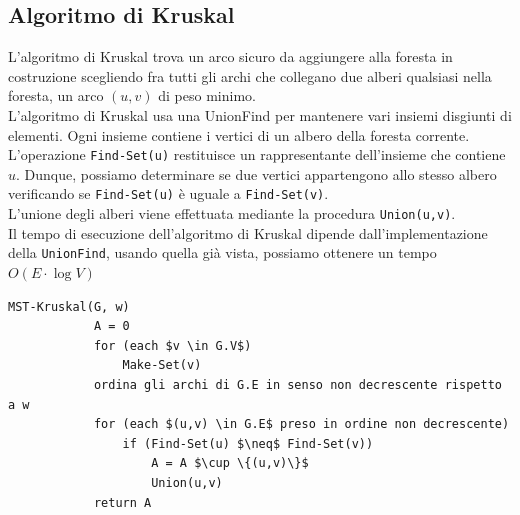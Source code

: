 \subsection{Algoritmo di Kruskal}
L'algoritmo di Kruskal trova un arco sicuro da aggiungere alla foresta in costruzione scegliendo fra tutti gli archi che collegano due alberi qualsiasi nella foresta, un arco $(u,v)$ di peso minimo.\\
L'algoritmo di Kruskal usa una UnionFind per mantenere vari insiemi disgiunti di elementi. Ogni insieme contiene i vertici di un albero della foresta corrente.\\
L'operazione \texttt{Find-Set(u)} restituisce un rappresentante dell'insieme che contiene $u$. Dunque, possiamo determinare se due vertici appartengono allo stesso albero verificando se \texttt{Find-Set(u)} è uguale a \texttt{Find-Set(v)}.\\
L'unione degli alberi viene effettuata mediante la procedura \texttt{Union(u,v)}.\\
Il tempo di esecuzione dell'algoritmo di Kruskal dipende dall'implementazione della \texttt{UnionFind}, usando quella già vista, possiamo ottenere un tempo $O(E \cdot \log V)$
    \begin{lstlisting}[caption = Algoritmo di Kruskal]
        MST-Kruskal(G, w)
            A = 0
            for (each $v \in G.V$)
                Make-Set(v)
            ordina gli archi di G.E in senso non decrescente rispetto a w
            for (each $(u,v) \in G.E$ preso in ordine non decrescente)
                if (Find-Set(u) $\neq$ Find-Set(v))
                    A = A $\cup \{(u,v)\}$
                    Union(u,v)
            return A
    \end{lstlisting}
    

